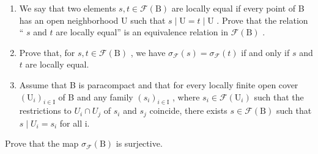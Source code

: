 \begin{enumerate}
\def\labelenumi{\alph{enumi})}
\item
  We say that two elements \(s, t \in \mathcal{F}(\mathrm{B})\) are locally equal if every point of B has an open neighborhood U such that \(s \mid \mathrm{U} = t \mid \mathrm{U}\) . Prove that the relation “ \(s\) and \(t\) are locally equal” is an equivalence relation in \(\mathcal{F}(\mathrm{B})\) .
\item
  Prove that, for \(s, t \in \mathcal{F}(\mathrm{B})\) , we have \(\sigma_{\mathcal{F}}(s) = \sigma_{\mathcal{F}}(t)\) if and only if \(s\) and \(t\) are locally equal.
\item
  Assume that B is paracompact and that for every locally finite open cover \((\mathrm{U}_{i})_{i\in\mathrm{I}}\) of B and any family \((s_{i})_{i\in\mathrm{I}}\) , where \(s_{i}\in\mathcal{F}(\mathrm{U}_{i})\) such that the restrictions to \(U_{i}\cap U_{j}\) of \(s_{i}\) and \(s_{j}\) coincide, there exists \(s\in\mathcal{F}(\mathrm{B})\) such that \(s\mid U_{i}=s_{i}\) for all i.
\end{enumerate}

Prove that the map \(\sigma_{\mathcal{F}}(\mathrm{B})\) is surjective.

